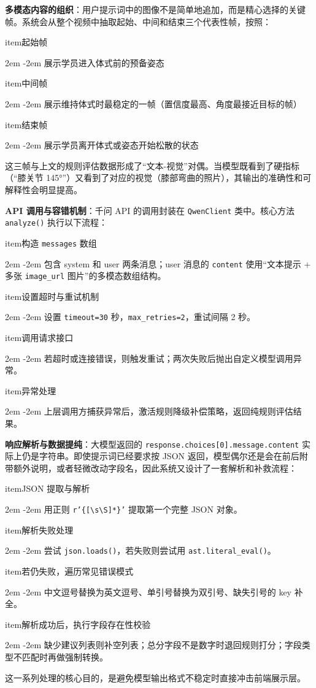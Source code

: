 \documentclass[UTF8,twoside]{ctexrep}
\makeatletter
\def@NAT@last@yr{\@citea}%
\def@NAT@last@yr{-\NAT@penalty}%
\newcommand{\listbodyaligntext}[1]{%
  \par\begingroup
    \parindent=0pt
    \parshape=2 2em \dimexpr\textwidth-2em\relax 0pt \textwidth
    \noindent\ignorespaces#1\unskip\par
  \endgroup
}
\newcommand{\researchitem}[2]{%
  \csname item\endcsname #1%
  \listbodyaligntext{#2}%
}
\makeatother
\begin{document}
\textbf{多模态内容的组织}：用户提示词中的图像不是简单地追加，而是精心选择的关键帧。系统会从整个视频中抽取起始、中间和结束三个代表性帧，按照：

\begin{researchlist}
  
  \researchitem{起始帧}{展示学员进入体式前的预备姿态}
  
  \researchitem{中间帧}{展示维持体式时最稳定的一帧（置信度最高、角度最接近目标的帧）}
  
  \researchitem{结束帧}{展示学员离开体式或姿态开始松散的状态}
\end{researchlist}

这三帧与上文的规则评估数据形成了“文本-视觉”对偶。当模型既看到了硬指标（“膝关节 145°”）又看到了对应的视觉（膝部弯曲的照片），其输出的准确性和可解释性会明显提高。

\textbf{API 调用与容错机制}：千问 API 的调用封装在 \texttt{QwenClient} 类中。核心方法 \texttt{analyze()} 执行以下流程：
\begin{researchlist}
  \researchitem{构造 \texttt{messages} 数组}{
    包含 system 和 user 两条消息；user 消息的 \texttt{content} 使用“文本提示 + 多张 \texttt{image\_url} 图片”的多模态数组结构。
  }
  \researchitem{设置超时与重试机制}{
    设置 \texttt{timeout=30} 秒，\texttt{max\_retries=2}，重试间隔 2 秒。
  }
  \researchitem{调用请求接口}{
    若超时或连接错误，则触发重试；两次失败后抛出自定义模型调用异常。
  }
  \researchitem{异常处理}{
    上层调用方捕获异常后，激活规则降级补偿策略，返回纯规则评估结果。
  }
\end{researchlist}

\textbf{响应解析与数据提纯}：大模型返回的 \texttt{response.choices[0].message.content} 实际上仍是字符串。即使提示词已经要求按 JSON 返回，模型偶尔还是会在前后附带额外说明，或者轻微改动字段名，因此系统又设计了一套解析和补救流程：
\begin{researchlist}
  \researchitem{JSON 提取与解析}{
    用正则 \texttt{r'\{[\textbackslash s\textbackslash S]*\}'} 提取第一个完整 JSON 对象。
  }
  \researchitem{解析失败处理}{
    尝试 \texttt{json.loads()}，若失败则尝试用 \texttt{ast.literal\_eval()}。
  }
  
\researchitem{若仍失败，遍历常见错误模式}{中文逗号替换为英文逗号、单引号替换为双引号、缺失引号的 key 补全。}
  
\researchitem{解析成功后，执行字段存在性校验}{缺少建议列表则补空列表；总分字段不是数字时退回规则打分；字段类型不匹配时再做强制转换。}
\end{researchlist}
这一系列处理的核心目的，是避免模型输出格式不稳定时直接冲击前端展示层。
\end{document}
